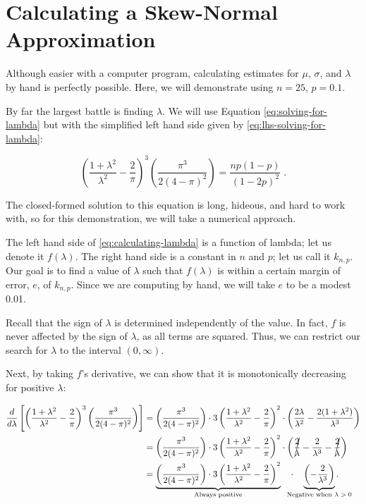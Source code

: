 \documentclass{article}
\begin{document}
\clearpage

\appendix
\section{Calculating a Skew-Normal Approximation}
\label{app:calc-sn-approx}

Although easier with a computer program, calculating estimates for $\mu$,
$\sigma$, and $\lambda$ by hand is perfectly possible. Here, we will
demonstrate using $n=25$, $p=0.1$.

By far the largest battle is finding $\lambda$. We will use Equation
\eqref{eq:solving-for-lambda} but with the simplified left hand side given by
\eqref{eq:lhs-solving-for-lambda}:

\begin{equation}
  \label{eq:calculating-lambda}
  \left( \frac{1+\lambda^2}{\lambda^2} - \frac{2}{\pi} \right)^3 \left( \frac{\pi^3}{2(4-\pi)^2} \right) = \frac{np(1-p)}{(1-2p)^2} \;.
\end{equation}

The closed-formed solution to this equation is long, hideous, and hard to work
with, so for this demonstration, we will take a numerical approach.

The left hand side of \eqref{eq:calculating-lambda} is a function of lambda;
let us denote it $f(\lambda)$. The right hand side is a constant in $n$ and
$p$; let us call it $k_{n,p}$. Our goal is to find a value of $\lambda$ such
that $f(\lambda)$ is within a certain margin of error, $e$, of $k_{n,p}$. Since
we are computing by hand, we will take $e$ to be a modest 0.01.

Recall that the sign of $\lambda$ is determined independently of the value. In
fact, $f$ is never affected by the sign of $\lambda$, as all terms are squared.
Thus, we can restrict our search for $\lambda$ to the interval $(0, \infty)$.

Next, by taking $f$'s derivative, we can show that it is monotonically
decreasing for positive $\lambda$:

\begin{align*}
  \frac{d}{d\lambda} \left[ \left( \frac{1+\lambda^2}{\lambda^2} - \frac{2}{\pi} \right)^3 \left( \frac{\pi^3}{2(4-\pi)^2} \right) \right] &= \left( \frac{\pi^3}{2(4-\pi)^2} \right) \cdot
    3 \left( \frac{1+\lambda^2}{\lambda^2} - \frac{2}{\pi} \right)^2 \cdot \left( \frac{2\lambda}{\lambda^2} - \frac{2(1+\lambda^2)}{\lambda^3} \right) \\
  &= \left( \frac{\pi^3}{2(4-\pi)^2} \right) \cdot 3 \left( \frac{1+\lambda^2}{\lambda^2} - \frac{2}{\pi} \right)^2 \cdot
    \left( \cancel{\frac{2}{\lambda}} - \frac{2}{\lambda^3} - \cancel{\frac{2}{\lambda}} \right) \\
  &= \underbrace{\left( \frac{\pi^3}{2(4-\pi)^2} \right) \cdot 3 \left( \frac{1+\lambda^2}{\lambda^2} - \frac{2}{\pi} \right)^2}_\textnormal{Always positive} \quad \cdot \quad
     \underbrace{\left( -\frac{2}{\lambda^3} \right)}_{\mathclap{\textnormal{Negative when $\lambda > 0$}}}.
\end{align*}
\end{document}

